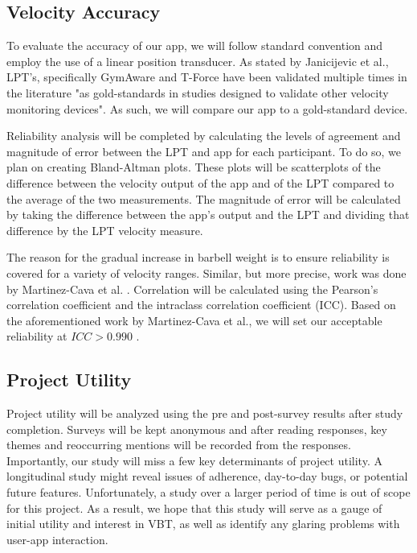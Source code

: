 \documentclass[10pt,twocolumn]{article}
\begin{document}
\subsection{Velocity Accuracy}
To evaluate the accuracy of our app, we will follow standard convention and employ the use of a linear position transducer.
As stated by Janicijevic et al., LPT's, specifically GymAware and T-Force have been validated multiple times in the literature "as gold-standards in studies designed to validate other velocity monitoring devices"\cite{Janicijevic2021}.
As such, we will compare our app to a gold-standard device.\par

Reliability analysis will be completed by calculating the levels of agreement and magnitude of error between the LPT and app for each participant.
To do so, we plan on creating Bland-Altman plots.
These plots will be scatterplots of the difference between the velocity output of the app and of the LPT compared to the average of the two measurements.
The magnitude of error will be calculated by taking the difference between the app's output and the LPT and dividing that difference by the LPT velocity measure. \par

The reason for the gradual increase in barbell weight is to ensure reliability is covered for a variety of velocity ranges.
Similar, but more precise, work was done by Martinez-Cava et al. \cite{Martinez-Cava2020}.
Correlation will be calculated using the Pearson's correlation coefficient and the intraclass correlation coefficient (ICC).
Based on the aforementioned work by Martinez-Cava et al., we will set our acceptable reliability at $ICC > 0.990$ \cite{Martinez-Cava2020}. 

\subsection{Project Utility}
Project utility will be analyzed using the pre and post-survey results after study completion.
Surveys will be kept anonymous and after reading responses, key themes and reoccurring mentions will be recorded from the responses.
Importantly, our study will miss a few key determinants of project utility.
A longitudinal study might reveal issues of adherence, day-to-day bugs, or potential future features.
Unfortunately, a study over a larger period of time is out of scope for this project.
As a result, we hope that this study will serve as a gauge of initial utility and interest in VBT, as well as identify any glaring problems with user-app interaction.
\end{document}
